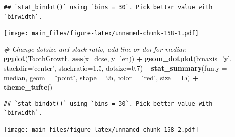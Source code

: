 \documentclass[]{book}
\newenvironment{Shaded}{\begin{snugshade}}{\end{snugshade}}
\newcommand{\KeywordTok}[1]{\textcolor[rgb]{0.13,0.29,0.53}{\textbf{#1}}}
\newcommand{\DataTypeTok}[1]{\textcolor[rgb]{0.13,0.29,0.53}{#1}}
\newcommand{\DecValTok}[1]{\textcolor[rgb]{0.00,0.00,0.81}{#1}}
\newcommand{\FloatTok}[1]{\textcolor[rgb]{0.00,0.00,0.81}{#1}}
\newcommand{\StringTok}[1]{\textcolor[rgb]{0.31,0.60,0.02}{#1}}
\newcommand{\CommentTok}[1]{\textcolor[rgb]{0.56,0.35,0.01}{\textit{#1}}}
\newcommand{\OperatorTok}[1]{\textcolor[rgb]{0.81,0.36,0.00}{\textbf{#1}}}
\newcommand{\NormalTok}[1]{#1}
\begin{document}
\begin{Shaded}
\end{Shaded}

\begin{verbatim}
## `stat_bindot()` using `bins = 30`. Pick better value with `binwidth`.
\end{verbatim}

\texttt{[image: main\_files/figure-latex/unnamed-chunk-168-1.pdf]}

\begin{Shaded}
\begin{Highlighting}[]
\CommentTok{# Change dotsize and stack ratio, add line or dot for median}
\KeywordTok{ggplot}\NormalTok{(ToothGrowth, }\KeywordTok{aes}\NormalTok{(}\DataTypeTok{x=}\NormalTok{dose, }\DataTypeTok{y=}\NormalTok{len)) }\OperatorTok{+}\StringTok{ }
\StringTok{  }\KeywordTok{geom_dotplot}\NormalTok{(}\DataTypeTok{binaxis=}\StringTok{'y'}\NormalTok{, }\DataTypeTok{stackdir=}\StringTok{'center'}\NormalTok{,}
               \DataTypeTok{stackratio=}\FloatTok{1.5}\NormalTok{, }\DataTypeTok{dotsize=}\FloatTok{0.7}\NormalTok{)}\OperatorTok{+}
\StringTok{  }\KeywordTok{stat_summary}\NormalTok{(}\DataTypeTok{fun.y =}\NormalTok{ median, }\DataTypeTok{geom =} \StringTok{"point"}\NormalTok{, }\DataTypeTok{shape =} \DecValTok{95}\NormalTok{, }
               \DataTypeTok{color =} \StringTok{"red"}\NormalTok{, }\DataTypeTok{size =} \DecValTok{15}\NormalTok{) }\OperatorTok{+}
\StringTok{  }\KeywordTok{theme_tufte}\NormalTok{()}
\end{Highlighting}
\end{Shaded}

\begin{verbatim}
## `stat_bindot()` using `bins = 30`. Pick better value with `binwidth`.
\end{verbatim}

\texttt{[image: main\_files/figure-latex/unnamed-chunk-168-2.pdf]}
\end{document}
